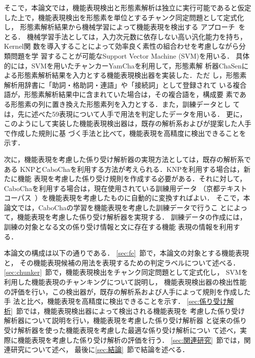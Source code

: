 \documentclass[japanese]{jnlp_1.3e}
\begin{document}
そこで，本論文では，機能表現検出と形態素解析は独立に実行可能であると仮定
した上で，機能表現検出を形態素を単位とするチャンク同定問題として定式化し，
形態素解析結果から機械学習によって機能表現を検出する
アプローチ~\cite{Tsuchiya07aj}をとる．
機械学習手法としては，入力次元数に依存しない高い汎化能力を持ち，Kernel関
数を導入することによって効率良く素性の組合わせを考慮しながら分類問題を学
習することが可能なSupport Vector Machine (SVM)\cite{Vapnik98a}を用いる．
具体的には，SVMを用いたチャンカーYamCha\cite{TKudo02bj}を利用して，形態素解
析器ChaSenによる形態素解析結果を入力とする機能表現検出器を実装した．ただ
し，形態素解析用辞書に「助詞・格助詞・連語」や「接続詞」として登録されて
いる複合語が，形態素解析結果中に含まれていた場合は，その複合語を，構成要
素である形態素の列に置き換えた形態素列を入力とする．また，訓練データとし
ては，先に述べた59表現について人手で用法を判定したデータを用いる．
更に，このようにして実装した機能表現検出器は，既存の解析系および\cite
{形態素情報を用いた日本語機能表現の検出}が提案した人手で作成した規則に基
づく手法と比べて，機能表現を高精度に検出できることを示す．

次に，機能表現を考慮した係り受け解析器の実現方法としては，既存の解析系である
KNPとCaboChaを利用する方法が考えられる．KNPを利用する場合は，新たに機能
表現を考慮した係り受け規則を作成する必要がある．それに対して，
CaboChaを利用する場合は，現在使用されている訓練用データ
（京都テキストコーパス~\cite{Kurohashi97bj}）を機能表現を考慮したものに自動的に変換すればよい．
そこで，本論文では，CaboChaの学習を機能表現を考慮した訓練データで行うこ
とによって，機能表現を考慮した係り受け解析器を実現する．
訓練データの作成には，訓練の対象となる文の係り受け情報と文に存在する機能
表現の情報を利用する．

本論文の構成は以下の通りである．
\ref{sec:fe}~節で，本論文の対象とする機能表現と，
その機能表現候補の用法を表現するための判定ラベルについて述べる．
\ref{sec:chunker}~節で，機能表現検出をチャンク同定問題として定式化し，
SVMを利用した機能表現のチャンキングについて説明し，
機能表現検出器の検出性能の評価を行い，この検出器が，既存の解析系および人手によって規則を作成した手
法と比べ，機能表現を高精度に検出できることを示す．
\ref{sec:係り受け解析}~節では，機能表現検出器によって検出される機能表現を
考慮した係り受け解析器について説明を行い，機能表現を考慮した係り受け解析器
と従来の係り受け解析器を使った機能表現を考慮した最適な係り受け解析につい
て述べ，実際に機能表現を考慮した係り受け解析の評価を行う．
\ref{sec:関連研究}~節では，関連研究について述べ，
最後に\ref{sec:結論}~節で結論を述べる．
\end{document}
